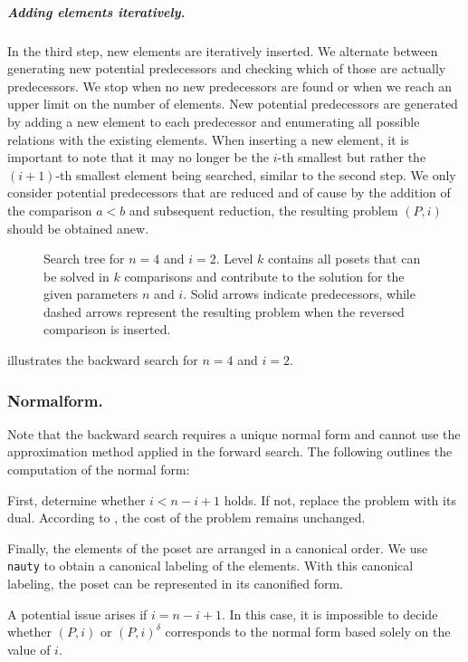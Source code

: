 \documentclass[a4paper,UKenglish,cleveref, autoref, thm-restate]{lipics-v2021}
\newcommand{\dual}[1]{{#1}^{\delta}}
\begin{document}
\subparagraph{Adding elements iteratively.}
In the third step, new elements are iteratively inserted.
We alternate between generating new potential predecessors and checking which of those are actually predecessors.
We stop when no new predecessors are found or when we reach an upper limit on the number of elements.
New potential predecessors are generated by adding a new element to each predecessor and enumerating all possible relations with the existing elements.
When inserting a new element, it is important to note that it may no longer be the $i$-th smallest but rather the $(i + 1)$-th smallest element being searched, similar to the second step.
We only consider potential predecessors that are reduced and of cause by the addition of the comparison $a < b$ and subsequent reduction, the resulting problem $(P, i)$ should be obtained anew.

\begin{figure}[!b]
  \centering
  
  \caption{Search tree for $n = 4$ and $i = 2$.
    Level $k$ contains all posets that can be solved in $k$ comparisons and contribute to the solution for the given parameters $n$ and $i$.
    Solid arrows indicate predecessors, while dashed arrows represent the resulting problem when the reversed comparison is inserted.}
  \label{fig:backward-search-tree}
\end{figure}

 illustrates the backward search for $n = 4$ and $i = 2$.

\subsubsection{Normalform.} \label{sec:backward:normal_form}
Note that the backward search requires a unique normal form and cannot use the approximation method applied in the forward search.
The following outlines the computation of the normal form:

First, determine whether $i < n - i + 1$ holds.
If not, replace the problem with its dual.
According to , the cost of the problem remains unchanged.

Finally, the elements of the poset are arranged in a canonical order.
We use \texttt{nauty} to obtain a canonical labeling of the elements.
With this canonical labeling, the poset can be represented in its canonified form.

A potential issue arises if $i = n - i + 1$.
In this case, it is impossible to decide whether $(P, i)$ or $\dual{(P, i)}$ corresponds to the normal form based solely on the value of $i$.
\end{document}
